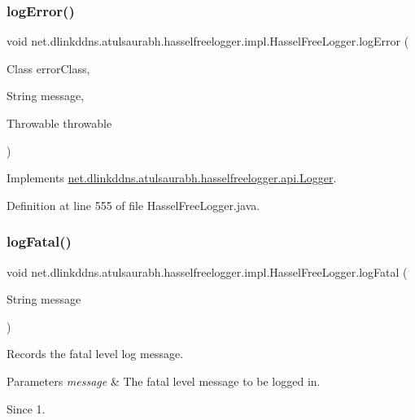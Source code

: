 \subsubsection{\texorpdfstring{log\+Error()}{logError()}\hspace{0.1cm}{\footnotesize\ttfamily [3/3]}}
{\footnotesize\ttfamily void net.\+dlinkddns.\+atulsaurabh.\+hasselfreelogger.\+impl.\+Hassel\+Free\+Logger.\+log\+Error (\begin{DoxyParamCaption}\item[{Class}]{error\+Class,  }\item[{String}]{message,  }\item[{Throwable}]{throwable }\end{DoxyParamCaption})}



Implements \mbox{\hyperlink{interfacenet_1_1dlinkddns_1_1atulsaurabh_1_1hasselfreelogger_1_1api_1_1_logger_a387cbc7fc16609202f2c63e88233ba49}{net.\+dlinkddns.\+atulsaurabh.\+hasselfreelogger.\+api.\+Logger}}.



Definition at line 555 of file Hassel\+Free\+Logger.\+java.

\mbox{\label{classnet_1_1dlinkddns_1_1atulsaurabh_1_1hasselfreelogger_1_1impl_1_1_hassel_free_logger_a478d877ebdbb5cb2796ad23d0dafe369}} 
\subsubsection{\texorpdfstring{log\+Fatal()}{logFatal()}\hspace{0.1cm}{\footnotesize\ttfamily [1/3]}}
{\footnotesize\ttfamily void net.\+dlinkddns.\+atulsaurabh.\+hasselfreelogger.\+impl.\+Hassel\+Free\+Logger.\+log\+Fatal (\begin{DoxyParamCaption}\item[{String}]{message }\end{DoxyParamCaption})}

Records the fatal level log message. 
\begin{DoxyParams}{Parameters}
{\em message} & The fatal level message to be logged in. \\
\hline
\end{DoxyParams}
\begin{DoxySince}{Since}
1. 
\end{DoxySince}


